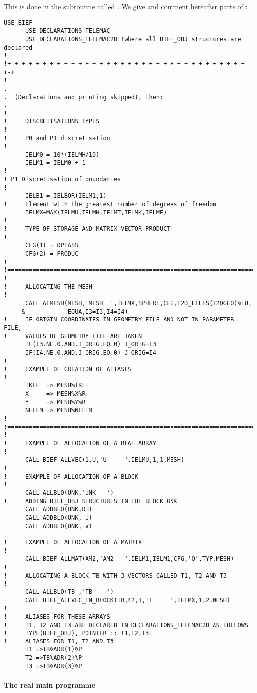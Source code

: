 This is done in the subroutine called . We give
and comment hereafter parts of :
\begin{lstlisting}[language=TelFortran]
      USE BIEF
      USE DECLARATIONS_TELEMAC
      USE DECLARATIONS_TELEMAC2D !where all BIEF_OBJ structures are declared
!
!+-+-+-+-+-+-+-+-+-+-+-+-+-+-+-+-+-+-+-+-+-+-+-+-+-+-+-+-+-+-+-+-+-+-+-+
!
.
.  (Declarations and printing skipped), then:
.
!
!     DISCRETISATIONS TYPES
!
!     P0 and P1 discretisation
!
      IELM0 = 10*(IELMH/10)
      IELM1 = IELM0 + 1
!
! P1 Discretisation of boundaries
!
      IELB1 = IELBOR(IELM1,1)
!     Element with the greatest number of degrees of freedom
      IELMX=MAX(IELMU,IELMH,IELMT,IELMK,IELME)
!
!     TYPE OF STORAGE AND MATRIX-VECTOR PRODUCT
!
      CFG(1) = OPTASS
      CFG(2) = PRODUC
!
!=======================================================================
!
!     ALLOCATING THE MESH
!
      CALL ALMESH(MESH,'MESH  ',IELMX,SPHERI,CFG,T2D_FILES(T2DGEO)%LU,
     &            EQUA,I3=I3,I4=I4)
!     IF ORIGIN COORDINATES IN GEOMETRY FILE AND NOT IN PARAMETER FILE,
!     VALUES OF GEOMETRY FILE ARE TAKEN
      IF(I3.NE.0.AND.I_ORIG.EQ.0) I_ORIG=I3
      IF(I4.NE.0.AND.J_ORIG.EQ.0) J_ORIG=I4
!
!     EXAMPLE OF CREATION OF ALIASES
!
      IKLE  => MESH%IKLE
      X     => MESH%X%R
      Y     => MESH%Y%R
      NELEM => MESH%NELEM
!
!=======================================================================
!
!     EXAMPLE OF ALLOCATION OF A REAL ARRAY
!
      CALL BIEF_ALLVEC(1,U,'U     ',IELMU,1,1,MESH)
!
!     EXAMPLE OF ALLOCATION OF A BLOCK
!
      CALL ALLBLO(UNK,'UNK   ')
!     ADDING BIEF_OBJ STRUCTURES IN THE BLOCK UNK
      CALL ADDBLO(UNK,DH)
      CALL ADDBLO(UNK, U)
      CALL ADDBLO(UNK, V)

!     EXAMPLE OF ALLOCATION OF A MATRIX
!
      CALL BIEF_ALLMAT(AM2,'AM2   ',IELM1,IELM1,CFG,'Q',TYP,MESH)
!
!     ALLOCATING A BLOCK TB WITH 3 VECTORS CALLED T1, T2 AND T3
!
      CALL ALLBLO(TB ,'TB    ')
      CALL BIEF_ALLVEC_IN_BLOCK(TB,42,1,'T     ',IELMX,1,2,MESH)
!
!     ALIASES FOR THESE ARRAYS
!     T1, T2 AND T3 ARE DECLARED IN DECLARATIONS_TELEMAC2D AS FOLLOWS
!     TYPE(BIEF_OBJ), POINTER :: T1,T2,T3
!     ALIASES FOR T1, T2 AND T3
      T1 =>TB%ADR(1)%P
      T2 =>TB%ADR(2)%P
      T3 =>TB%ADR(3)%P
\end{lstlisting}

\paragraph{The real main programme}

